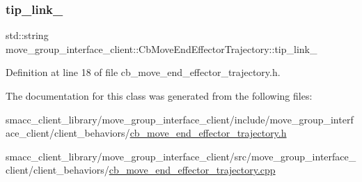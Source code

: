 \subsubsection{\texorpdfstring{tip\+\_\+link\+\_\+}{tip\_link\_}}
{\footnotesize\ttfamily std\+::string move\+\_\+group\+\_\+interface\+\_\+client\+::\+Cb\+Move\+End\+Effector\+Trajectory\+::tip\+\_\+link\+\_\+}



Definition at line 18 of file cb\+\_\+move\+\_\+end\+\_\+effector\+\_\+trajectory.\+h.



The documentation for this class was generated from the following files\+:\begin{DoxyCompactItemize}
\item 
smacc\+\_\+client\+\_\+library/move\+\_\+group\+\_\+interface\+\_\+client/include/move\+\_\+group\+\_\+interface\+\_\+client/client\+\_\+behaviors/\hyperlink{cb__move__end__effector__trajectory_8h}{cb\+\_\+move\+\_\+end\+\_\+effector\+\_\+trajectory.\+h}\item 
smacc\+\_\+client\+\_\+library/move\+\_\+group\+\_\+interface\+\_\+client/src/move\+\_\+group\+\_\+interface\+\_\+client/client\+\_\+behaviors/\hyperlink{cb__move__end__effector__trajectory_8cpp}{cb\+\_\+move\+\_\+end\+\_\+effector\+\_\+trajectory.\+cpp}\end{DoxyCompactItemize}
